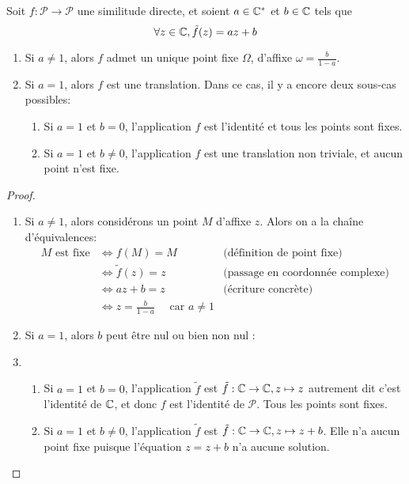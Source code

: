 \begin{proposition}
Soit $f :\mathcal P\to \mathcal P$ une similitude directe, et soient $a\in\mathbb{C}^*$ et $b\in\mathbb{C}$ tels que 
\[ \forall z\in\mathbb{C}, \tilde f (z) = az+b\]
\begin{enumerate}
\item Si $a\neq 1$, alors $f$ admet un unique point fixe $\Omega$, d'affixe $\omega=\frac{b}{1-a}$.
\item Si $a=1$, alors $f$ est une translation. Dans ce cas, il y a encore deux sous-cas possibles:
\begin{enumerate}
\item Si $a=1$ et $b=0$, l'application $f$ est l'identité et tous les points sont fixes.
\item Si $a=1$ et $b\neq 0$, l'application $f$ est une translation non triviale, et aucun point n'est fixe.
\end{enumerate}
\end{enumerate}
\end{proposition}
\begin{proof}
\begin{enumerate}
\item Si $a\neq 1$, alors considérons un point $M$ d'affixe $z$. Alors on a la chaîne d'équivalences:
\begin{align*}
M\text{ est fixe}
&\iff f(M)=M& \text{(définition de point fixe)}\\
&\iff \tilde f(z)=z & \text{(passage en coordonnée complexe)}\\
&\iff az+b=z & \text{(écriture concrète)} \\
&\iff z=\frac{b}{1-a}\quad \text{ car }a\neq 1
\end{align*}
\item Si $a=1$, alors $b$ peut être nul ou bien non nul :
\item 
\begin{enumerate}
\item Si $a=1$ et $b=0$, l'application $\tilde f$ est $\tilde f : \mathbb{C}\to\mathbb{C}, z\mapsto z$ autrement dit c'est l'identité de $\mathbb{C}$, et donc $f$ est l'identité de $\mathcal P$. Tous les points sont fixes.
\item Si $a=1$ et $b\neq 0$, l'application $\tilde f$ est $\tilde f : \mathbb{C}\to\mathbb{C}, z\mapsto z+b$. Elle n'a aucun point fixe puisque l'équation $z=z+b$ n'a aucune solution.
\end{enumerate}
\end{enumerate}
\end{proof}


